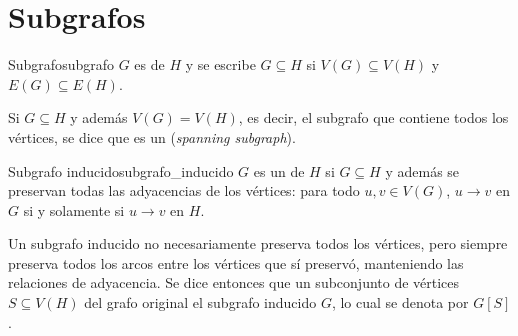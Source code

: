 \section{Subgrafos}
\label{sec:subgrafos}

\begin{definicion}{Subgrafo}{subgrafo}
  \(G\) es  de \(H\) y se escribe \(G\subseteq H\) si \(V(G) \subseteq V(H)\) y \(E(G) \subseteq E(H)\).
\end{definicion}
Si \(G \subseteq H\) y además \(V(G)=V(H)\), es decir, el subgrafo que contiene todos los vértices, se dice que es un  (\textit{spanning subgraph}).

\begin{definicion}{Subgrafo inducido}{subgrafo_inducido}
  \(G\) es un  de \(H\) si \(G \subseteq H\) y además se preservan todas las adyacencias de los vértices: para todo \(u, v \in V(G)\), \(u\longrightarrow v\) en \(G\) si y solamente si \(u\longrightarrow v\) en \(H\).
\end{definicion}

Un subgrafo inducido no necesariamente preserva todos los vértices, pero siempre preserva todos los arcos entre los vértices que sí preservó, manteniendo las relaciones de adyacencia. Se dice entonces que un subconjunto de vértices $S \subseteq V(H)$ del grafo original  el subgrafo inducido $G$, lo cual se denota por $G[S]$.

